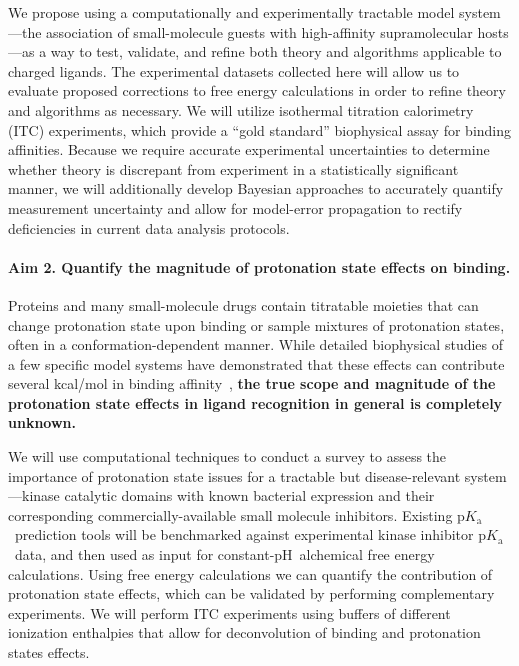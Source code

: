 \documentclass[10pt,final]{article}
\newcommand{\pKa}{p$K_\mathrm{a}$\ }
\newcommand{\pH}{p$\mathrm{H}$\ }
\begin{document}
We propose using a computationally and experimentally tractable model system---the association of small-molecule guests with high-affinity supramolecular hosts---as a way to test, validate, and refine both theory and algorithms applicable to charged ligands.
%
The experimental datasets collected here will allow us to evaluate proposed corrections to free energy calculations in order to refine theory and algorithms as necessary.
%
We will utilize isothermal titration calorimetry (ITC) experiments, which provide a ``gold standard'' biophysical assay for binding affinities.
%
Because we require accurate experimental uncertainties to determine whether theory is discrepant from experiment in a statistically significant manner, we will additionally develop Bayesian approaches to accurately quantify measurement uncertainty and allow for model-error propagation to rectify deficiencies in current data analysis protocols.

\paragraph*{Aim 2. Quantify the magnitude of protonation state effects on binding.}
Proteins and many small-molecule drugs contain titratable moieties that can change protonation state upon binding or sample mixtures of protonation states, often in a conformation-dependent manner.
%
While detailed biophysical studies of a few specific model systems have demonstrated that these effects can contribute several kcal/mol in binding affinity~\autocite{Dullweber2001a,Aleksandrov2007a,Czodrowski2007a,Steuber2007a,Czodrowski2007b}, \textbf{the true scope and magnitude of the protonation state effects in ligand recognition in general is completely unknown.}

We will use computational techniques to conduct a survey to assess the importance of protonation state issues for a tractable but disease-relevant system---kinase catalytic domains with known bacterial expression and their corresponding commercially-available small molecule inhibitors.
%
Existing \pKa prediction tools will be benchmarked against experimental kinase inhibitor \pKa data, and then used as input for constant-\pH alchemical free energy calculations.
%
Using free energy calculations we can quantify the contribution of protonation state effects, which can be validated by performing complementary experiments.
%
We will perform ITC experiments using buffers of different ionization enthalpies that allow for deconvolution of binding and protonation states effects.
\end{document}
